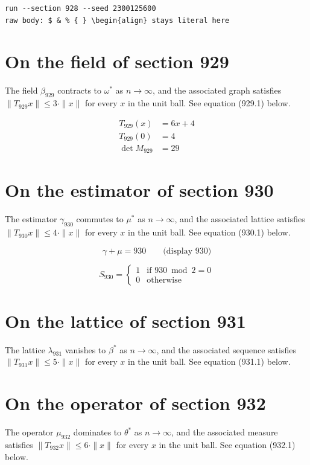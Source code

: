 \documentclass{article}
\begin{document}
\begin{verbatim}
run --section 928 --seed 2300125600
raw body: $ & % { } \begin{align} stays literal here
\end{verbatim}

\section{On the field of section 929}
The field $\beta_{929}$ contracts to $\omega^{*}$ as $n \to \infty$,
and the associated graph satisfies $\|T_{929} x\| \leq 3 \cdot \|x\|$
for every $x$ in the unit ball. See equation (929.1) below.

\begin{align}
T_{929}(x) &= 6 x + 4 \\
T_{929}(0) &= 4 \\
\det M_{929} &= 29
\end{align}

\section{On the estimator of section 930}
The estimator $\gamma_{930}$ commutes to $\mu^{*}$ as $n \to \infty$,
and the associated lattice satisfies $\|T_{930} x\| \leq 4 \cdot \|x\|$
for every $x$ in the unit ball. See equation (930.1) below.

$$
\gamma + \mu = 930 \qquad \text{(display 930)}
$$

\begin{equation}
S_{930} = \begin{cases} 1 & \text{if } 930 \bmod 2 = 0 \\ 0 & \text{otherwise} \end{cases}
\end{equation}

\section{On the lattice of section 931}
The lattice $\lambda_{931}$ vanishes to $\beta^{*}$ as $n \to \infty$,
and the associated sequence satisfies $\|T_{931} x\| \leq 5 \cdot \|x\|$
for every $x$ in the unit ball. See equation (931.1) below.

\section{On the operator of section 932}
The operator $\mu_{932}$ dominates to $\theta^{*}$ as $n \to \infty$,
and the associated measure satisfies $\|T_{932} x\| \leq 6 \cdot \|x\|$
for every $x$ in the unit ball. See equation (932.1) below.
\end{document}

